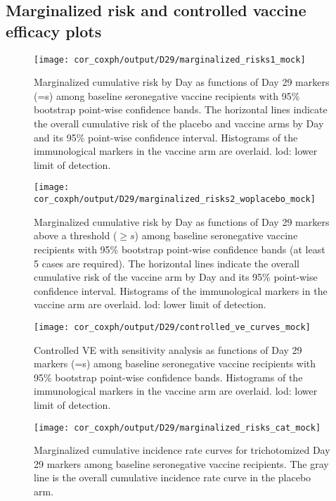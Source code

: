 \documentclass[
]{article}
\begin{document}
\clearpage

\hypertarget{marginalized-risk-and-controlled-vaccine-efficacy-plots-1}{%
\subsection{Marginalized risk and controlled vaccine efficacy plots}\label{marginalized-risk-and-controlled-vaccine-efficacy-plots-1}}

\begin{figure}[H]
    \centering
    \texttt{[image: cor\_coxph/output/D29/marginalized\_risks1\_mock]}
    \caption{Marginalized cumulative risk by Day \protect as functions of Day 29 markers (=s) among baseline seronegative vaccine recipients with 95\% bootstrap point-wise confidence bands. The horizontal lines indicate the overall cumulative risk of the placebo and vaccine arms by Day \protect and its 95\% point-wise confidence interval. Histograms of the immunological markers in the vaccine arm are overlaid. lod: lower limit of detection.}
\end{figure}

\begin{figure}[H]
    \centering
    \texttt{[image: cor\_coxph/output/D29/marginalized\_risks2\_woplacebo\_mock]}
    \caption{Marginalized cumulative risk by Day \protect as functions of Day 29 markers above a threshold ($\geq s$) among baseline seronegative vaccine recipients with 95\% bootstrap point-wise confidence bands (at least 5 cases are required). The horizontal lines indicate the overall cumulative risk of the vaccine arm by Day \protect and its 95\% point-wise confidence interval. Histograms of the immunological markers in the vaccine arm are overlaid. lod: lower limit of detection.}
\end{figure}

\begin{figure}[H]
    \centering
    \texttt{[image: cor\_coxph/output/D29/controlled\_ve\_curves\_mock]}
    \caption{Controlled VE with sensitivity analysis as functions of Day 29 markers (=s) among baseline seronegative vaccine recipients with 95\% bootstrap point-wise confidence bands. Histograms of the immunological markers in the vaccine arm are overlaid. lod: lower limit of detection.}
\end{figure}

\begin{figure}[H]
    \centering
    \texttt{[image: cor\_coxph/output/D29/marginalized\_risks\_cat\_mock]}
    \caption{Marginalized cumulative incidence rate curves for trichotomized Day 29 markers among baseline seronegative vaccine recipients. The gray line is the overall cumulative incidence rate curve in the placebo arm.}
\end{figure}
\end{document}
